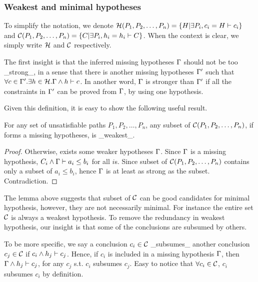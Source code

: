 \subsubsection{Weakest and minimal hypotheses}

To simplify the notation, we denote $\mathcal{H}(P_1, P_2, \dots,
P_n) = \{ H | \exists P_i,c_i = H \vdash c_i\}$ and
$\mathcal{C}(P_1, P_2, \dots, P_n) = \{ C | \exists P_i,h_i = h_i
\vdash C\}$. When the context is clear, we simply write $\mathcal{H}$
and $\mathcal{C}$ respectively.

The first insight is that the inferred missing hypotheses $\Gamma$ should
not be too _strong_, in a sense that there is another missing
hypotheses $\Gamma'$ such that $\forall c\in \Gamma'.\exists h\in \mathcal{H}.
\Gamma \land h \vdash c$. In another word, $\Gamma$ is stronger than $\Gamma'$ if
all the constraints in $\Gamma'$ can be proved from $\Gamma$, by using one
hypothesis.

Given this definition, it is easy to show the following useful result.
%
\begin{Lemma}
For any set of unsatisfiable paths $P_1, P_2, \dots, P_n$, any subset
of $\mathcal{C}(P_1, P_2, \dots, P_n)$, if forms a missing
hypotheses, is _weakest_.
\end{Lemma}
\begin{proof}
Otherwise, exists some weaker hypotheses $\Gamma$. Since $\Gamma$ is a missing
hypothesis, $C_i \land \Gamma\vdash a_i\leq b_i$  for all $i$s. Since
subset of $\mathcal{C}(P_1, P_2, \dots, P_n)$ contains only a
subset of $a_i \leq b_i$, hence $\Gamma$ is at least as strong as the
subset. Contradiction.
\end{proof}


The lemma above suggests that subset of $\mathcal{C}$ can be good
candidates for minimal hypothesis, however, they are not necessarily
minimal. For instance the entire set $\mathcal{C}$ is always a weakest
hypothesis. To remove the redundancy in weakest hypothesis, our
insight is that some of the conclusions are subsumed by others. 

To be more specific, we say a conclusion $c_i \in \mathcal{C}$ 
_subsumes_ another conclusion $c_j\in \mathcal{C}$ if $c_i \land h_j
\vdash c_j$. Hence, if $c_i$ is included in a missing hypothesis
$\Gamma$, then $\Gamma \land h_j\vdash c_j$, for any $c_j$ s.t. $c_i$
subsumes $c_j$. Easy to notice that $\forall c_i \in \mathcal{C}$, $c_i$
subsumes $c_i$ by definition.

